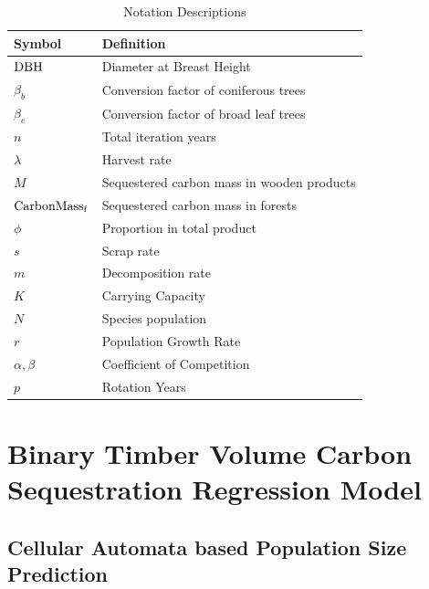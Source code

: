 \documentclass{mcmthesis}
\numberwithin{figure}{section}
\numberwithin{table}{section}
\numberwithin{equation}{section}
\begin{document}
\renewcommand\arraystretch{1.5}

\begin{table}[htpb!]
  \centering
  \caption{Notation Descriptions}
  \begin{tabular}{m{2.5cm}<{\centering}|m{12.5cm}<{\centering}}
  \toprule[1.5pt]
  \textbf{Symbol} & \textbf{Definition} \\ \hline
  $ \rm{DBH} $ & Diameter at Breast Height \\
  $ \beta_b $ & Conversion factor of coniferous trees\\
  $\beta_c$ & Conversion factor of broad leaf trees\\
  $ n $ & Total iteration years\\
  $ \lambda $ & Harvest rate\\
  $ M $ & Sequestered carbon mass in wooden products \\
  $ \rm{CarbonMass_f} $ & Sequestered carbon mass in forests \\
  $ \phi $ & Proportion in total product\\
  $ s $ & Scrap rate\\
  $ m $ & Decomposition rate \\
  $ K $ & Carrying Capacity \\
  $ N $ & Species population \\
  $ r $ & Population Growth Rate\\
  $ \alpha,\beta $ & Coefficient of Competition\\
  $ p $ & Rotation Years \\
  

  \bottomrule[1.5pt]
  \end{tabular}
\end{table}

\newpage

\section{Binary Timber Volume Carbon Sequestration Regression Model}
\subsection{Cellular Automata based Population Size Prediction}
\end{document}
